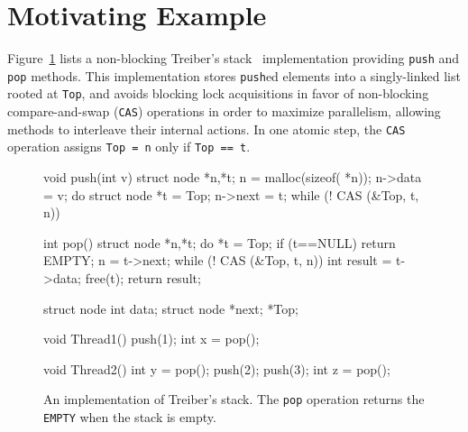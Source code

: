 
\section{Motivating Example}
\label{sec:motivation}

Figure~\ref{fig:treiber} lists a non-blocking Treiber's stack~\cite{Treiber'86}
implementation providing {\tt push} and {\tt pop} methods. This implementation
stores {\tt push}ed elements into a singly-linked list rooted at {\tt Top}, and
avoids blocking lock acquisitions in favor of non-blocking compare-and-swap
({\tt CAS}) operations in order to maximize parallelism, allowing methods to
interleave their internal actions. In one atomic step, the {\tt CAS} operation
assigns {\tt Top = n} only if {\tt Top == t}.


\begin{figure}[t]
  \scriptsize
  \begin{minipage}[t]{45mm}
    \begin{program}
void push(int v) {
  struct node *n,*t;
  n = malloc(sizeof( *n));
  n->data = v;
  do {
    struct node *t = Top;
    n->next = t;
  } while (! CAS (&Top, t, n))
}

int pop() {
  struct node *n,*t;
  do {
    *t = Top;
    if (t==NULL) return EMPTY;
    n = t->next;
  } while (! CAS (&Top, t, n))
  int result = t->data;
  free(t);
  return result;
}
    \end{program}
  \end{minipage}
  \begin{minipage}[t]{35mm}
    \begin{program}
struct node {
  int data;
  struct node *next;
} *Top;  

void Thread1() {
  push(1);
  int x = pop();
}

void Thread2() {
  int y = pop();
  push(2);
  push(3);
  int z = pop();
}
    \end{program}
  \end{minipage}

  \caption{An implementation of Treiber's stack. The {\tt pop} operation
  returns the {\tt EMPTY} when the stack is empty.}
  \label{fig:treiber}
\end{figure}

